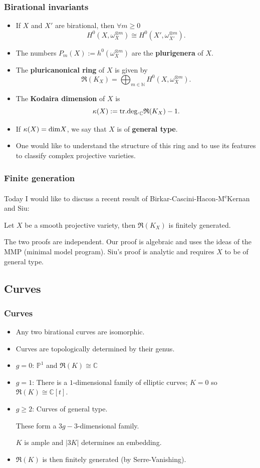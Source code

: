 \documentclass{beamer}
\theoremstyle{plain}
\theoremstyle{definition}
\theoremstyle{remark}
\begin{document}
\begin{frame}
  \frametitle{Birational invariants}
\begin{itemize}
\item If $X$ and $X'$ are birational, then $\forall m\geq 0$
$$H^0(X,\omega _{X}^{\otimes m})\cong H^0(X',\omega _{X'}^{\otimes m}).$$ 
\item The numbers $P_m(X):=h^0(\omega _{X}^{\otimes m})$ are the {\bf plurigenera} of $X$.
\item The {\bf pluricanonical ring} of $X$ is given by $$\mathfrak{R}(K_X)=\bigoplus _{m\in \mathbb {N}}H^0(X,\omega _{X}^{\otimes m}).$$ 
\item The {\bf Kodaira dimension} of $X$ is $$\kappa (X):={\rm tr.deg.}_{\mathbb {C}} \mathfrak{R}(K_X) -1.$$
\item If $\kappa (X)={\rm dim}X$, we say that $X$ is of {\bf general type}.
\item One would like to understand the structure of this ring and to use its features to classify complex projective varieties.
\end{itemize}

\end{frame}
\begin{frame}
  \frametitle{Finite generation}
Today I would like to discuss a recent result of
Birkar-Cascini-Hacon-M\textsuperscript{c}Kernan and Siu:
\begin{theorem} Let $X$ be a smooth projective variety, then $  \mathfrak{R}(K_X)$ is finitely generated.\end{theorem}
The two proofs are independent. Our proof is algebraic and uses the ideas of the MMP (minimal model program). Siu's proof is analytic and requires $X$ to be of general type.
\end{frame}
\subsection{Curves}

\begin{frame}
  \frametitle{Curves}
\begin{itemize}
\item Any two birational curves are isomorphic.
\item Curves are topologically determined by their genus. 
\item $g=0$: ${\mathbb P} ^1$ and $\mathfrak{R}(K)\cong \mathbb {C}$
\item $g=1$: There is a $1$-dimensional family of elliptic curves; $K=0$ so 
$\mathfrak{R}(K)\cong \mathbb {C}[t]$.
\item $g\geq 2$: Curves of general type. 

These form a $3g-3$-dimensional family.  

$K$ is ample and $|3K|$ determines an embedding.

\item $\mathfrak{R}(K)$ is then finitely generated (by Serre-Vanishing).
\end{itemize}

\end{frame}
\end{document}
